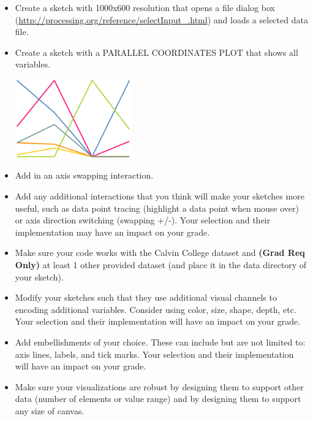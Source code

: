 \documentclass[a4paper,12pt]{article}
\begin{document}
\begin{itemize}


\item Create a sketch with 1000x600 resolution that opens a file dialog box (\url{http://processing.org/reference/selectInput_.html}) and loads a selected data file. 

\item Create a sketch with a PARALLEL COORDINATES PLOT that shows all variables.


\begin{center}
\includegraphics[width=5cm]{../images/pcp.png} 
\end{center}

\item Add in an axis swapping interaction.

\item Add any additional interactions that you think will make your sketches more useful, such as data point tracing (highlight a data point when mouse over) or axis direction switching (swapping +/-). Your selection and their implementation may have an impact on your grade.

\item Make sure your code works with the Calvin College dataset and \textbf{(Grad Req Only)} at least 1 other provided dataset (and place it in the data directory of your sketch).

\item Modify your sketches such that they use additional visual channels to encoding additional variables. Consider using color, size, shape, depth, etc. Your selection and their implementation will have an impact on your grade.

\item Add embellishments of your choice. These can include but are not limited to: axis lines, labels, and tick marks. Your selection and their implementation will have an impact on your grade.

\item Make sure your visualizations are robust by designing them to support other data (number of elements or value range) and by designing them to support any size of canvas.

\end{itemize}
\end{document}
